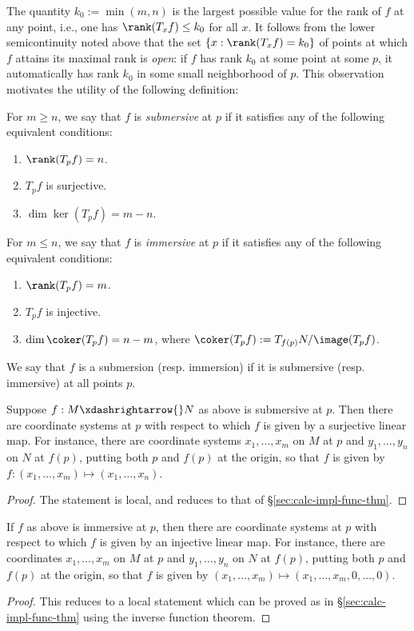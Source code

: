 \documentclass[reqno]{amsart} 
\begin{document}
The quantity $k_0 := \min(m,n)$
is the largest possible value
for the rank of $f$ at any point,
i.e., one has $\rank(T_x f) \leq k_0$ for all $x$.
It follows from the lower semicontinuity
noted above that the set
$\{x : \rank(T_x f) = k_0 \}$ of points
at which $f$ attains its maximal rank is \emph{open}:
if $f$ has rank $k_0$ at some point at some $p$,
it automatically has rank $k_0$ in some small neighborhood of
$p$.
This observation motivates the utility
of the following definition:
\begin{definition}
  For $m \geq n$,
  we say that $f$ is \emph{submersive} at $p$
  if it satisfies any of the following
  equivalent conditions:
  \begin{enumerate}
  \item $\rank(T_p f) = n$.
  \item $T_p f$ is surjective.
  \item $\dim \ker(T_p f) = m - n$.
  \end{enumerate}

  For $m \leq n$,
  we say that $f$ is \emph{immersive} at $p$
  if it satisfies any of the following
  equivalent conditions:
  \begin{enumerate}
  \item $\rank(T_p f) = m$.
  \item $T_p f$ is injective.
  \item $\dim \coker(T_p f) = n-m$,
    where $\coker(T_p f) := T_{f(p)}N/\image(T_p f)$.
  \end{enumerate}

  We say that $f$ is a submersion (resp. immersion)
  if it is submersive (resp. immersive) at all points $p$.
\end{definition}
\begin{theorem}
  Suppose $f : M \xdashrightarrow{} N$ as above is submersive at
  $p$.  Then there are coordinate systems at $p$ with respect to
  which $f$ is given by a surjective linear map.  For instance,
  there are coordinate systems $x_1,\dotsc,x_m$ on $M$ at $p$
  and $y_1,\dotsc,y_n$ on $N$ at $f(p)$, putting both $p$ and
  $f(p)$ at the origin, so that $f$ is given by
  $f : (x_1,\dotsc,x_m) \mapsto (x_1,\dotsc,x_n)$.
\end{theorem}
\begin{proof}
  The statement is local, and reduces to that of \S\ref{sec:calc-impl-func-thm}.
\end{proof}
\begin{theorem}
  If $f$ as above is immersive at $p$,
  then there are coordinate systems at $p$ with respect to
  which $f$ is given by an injective linear map.  For instance,
  there are coordinates
  $x_1,\dotsc,x_m$ on $M$ at $p$
  and $y_1,\dotsc,y_n$ on $N$ at $f(p)$,
  putting both $p$ and $f(p)$ at the origin,
  so that
  $f$ is given 
  by
  $(x_1,\dotsc,x_m) \mapsto (x_1,\dotsc,x_m,0,\dotsc,0)$.
\end{theorem}
\begin{proof}
 This reduces to a local statement which can be proved 
as in \S\ref{sec:calc-impl-func-thm}
using the inverse function theorem. 
\end{proof}
\end{document}
